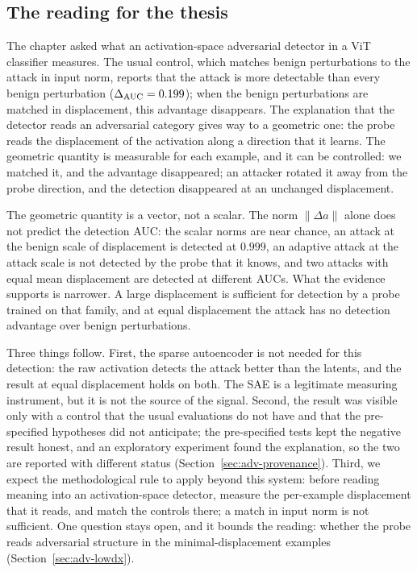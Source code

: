 \documentclass[../ppgc-tese.tex]{subfiles}
\begin{document}
\subsection{The reading for the thesis}

The chapter asked what an activation-space adversarial detector in a ViT
classifier measures. The usual control, which matches benign perturbations to
the attack in input norm, reports that the attack is more detectable than
every benign perturbation ($\Delta_{\mathrm{AUC}}=0.199$); when the benign perturbations are
matched in displacement, this advantage disappears. The explanation that the
detector reads an adversarial category gives way to a geometric one: the probe
reads the displacement of the activation along a direction that it learns.
The geometric quantity is measurable for each example, and it can be
controlled: we matched it, and the advantage disappeared; an attacker rotated
it away from the probe direction, and the detection disappeared at an
unchanged displacement.

The geometric quantity is a vector, not a scalar. The norm
$\lVert\Delta a\rVert$ alone does not predict the detection AUC: the scalar
norms are near chance, an attack at the benign scale of displacement is
detected at $0.999$, an adaptive attack at the attack scale is not detected by
the probe that it knows, and two attacks with equal mean displacement are
detected at different AUCs. What the evidence supports is narrower. A large
displacement is sufficient for detection by a probe trained on that family,
and at equal displacement the attack has no detection advantage over benign
perturbations.

Three things follow. First, the sparse autoencoder is not needed for this
detection: the raw activation detects the attack better than the latents, and
the result at equal displacement holds on both. The SAE is a legitimate
measuring instrument, but it is not the source of the signal. Second, the result was visible only with a control that
the usual evaluations do not have and that the pre-specified hypotheses did
not anticipate; the pre-specified tests kept the negative result honest, and
an exploratory experiment found the explanation, so the two are reported with
different status (Section~\ref{sec:adv-provenance}). Third, we expect the
methodological rule to apply beyond this system: before reading meaning into
an activation-space detector, measure the per-example displacement that it
reads, and match the controls there; a match in input norm is not sufficient.
One question stays open, and it bounds the reading: whether the probe reads
adversarial structure in the minimal-displacement examples
(Section~\ref{sec:adv-lowdx}).
\end{document}
